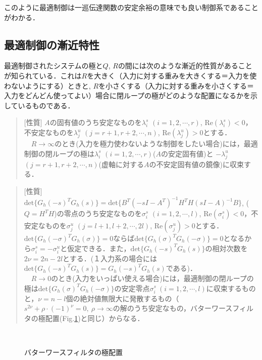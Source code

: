 このように最適制御は一巡伝達関数の安定余裕の意味でも良い制御系であることがわかる．


\subsection{最適制御の漸近特性}

最適制御されたシステムの極と$Q$, $R$の間には次のような漸近的性質があることが知られている．これは$R$を大きく（入力に対する重みを大きくする＝入力を使わないようにする）ときと, $R$を小さくする（入力に対する重みを小さくする＝入力をどんどん使ってよい）場合に閉ループの極がどのような配置になるかを示しているものである．

\begin{quote}
[性質] $A$の固有値のうち安定なものを$\lambda^s_i$ $(i=1,2,\cdots,r)$, $\mbox{Re}(\lambda^s_i) < 0$，不安定なものを$\lambda^u_j$ $(j=r+1,r+2,\cdots,n)$, $\mbox{Re}(\lambda^u_j) > 0$とする．
\\{}
\ \ 
$R \rightarrow \infty$のとき(入力を極力使わないような制御をしたい場合)には，最適制御の閉ループの極は$\lambda^s_i$ $(i=1,2,\cdots,r)$($A$の安定固有値)と $-\lambda^u_j$ $(j=r+1,r+2,\cdots,n)$(虚軸に対する$A$の不安定固有値の鏡像)に収束する．

\end{quote}

\begin{quote}
[性質] $ \mbox{det} \{G_h(-s)^T G_h(s)\}= \mbox{det}\{B^T (-sI - A^T)^{-1}H^T H (sI - A)^{-1} B\}$, ($Q=H^T H$)の零点のうち安定なものを$\sigma^s_i$ $(i=1,2,\cdots,l)$, $\mbox{Re}(\sigma^s_i) < 0$，不安定なものを$\sigma^u_j$ $(j=l+1,l+2,\cdots,2l)$, $\mbox{Re}(\sigma^u_j) > 0$とする．$ \mbox{det} \{G_h(-\sigma)^T G_h(\sigma)\}=0$ならば$ \mbox{det} \{G_h(\sigma)^T G_h(-\sigma)\}=0$となるから$\sigma^s_i=-\sigma^u_i$と仮定できる．また，$ \mbox{det} \{G_h(-s)^T G_h(s)\}$の相対次数を$2\nu=2n-2l$とする．(１入力系の場合には$ \mbox{det} \{G_h(-s)^T G_h(s)\} = G_h(-s)^T G_h(s)$である)．
\\{}
\ \ 
$R \rightarrow 0$のとき(入力をいっぱい使える場合)には，最適制御の閉ループの極は$ \mbox{det} \{G_h(\sigma)^T G_h(-\sigma)\}$の安定零点$\sigma^s_i\ (i=1,2,\cdots, l)$に収束するものと，$\nu=n-l$個の絶対値無限大に発散するもの（$s^{2\nu}+\rho \cdot (-1)^\nu=0,\  \rho \rightarrow \infty$の解のうち安定なもの，バターワースフィルタの極配置(Fig.\ref{fig:butterworth})と同じ）からなる．
\end{quote}

\begin{figure}[htbp]
 \begin{center}
  \caption{バターワースフィルタの極配置}
  \label{fig:butterworth}
 \end{center}
\end{figure}


